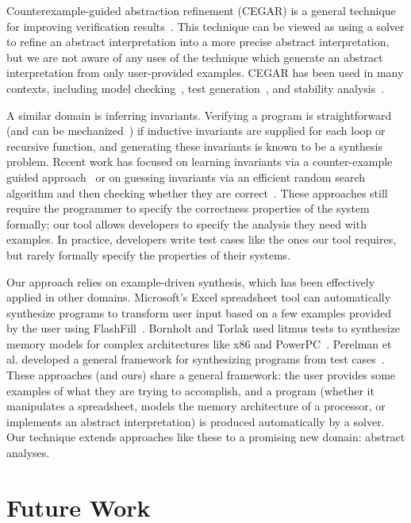 \documentclass[10pt,conference]{IEEEtran}
\begin{document}
Counterexample-guided abstraction refinement (CEGAR) is a general technique
for improving verification results~\cite{cegar}. This technique can be
viewed as using a solver to refine an abstract interpretation into a
more precise abstract interpretation, but we are not aware of any
uses of the technique which generate an abstract interpretation from
only user-provided examples. CEGAR has been used in many contexts,
including model checking~\cite{clarke2003counterexample},
test generation~\cite{beyer2004},
and stability analysis~\cite{prabhakar2016counterexample}.

A similar domain is inferring invariants. Verifying a program is straightforward
(and can be mechanized~\cite{hoare69}) if inductive invariants are supplied for
each loop or recursive function, and generating these invariants is
known to be a synthesis problem. Recent work has focused on learning
invariants via a counter-example guided approach~\cite{garg2014ice} or
on guessing invariants via an efficient random search algorithm and then
checking whether they are correct~\cite{sharma2016invariant}.
These approaches still require the programmer to specify the correctness
properties of the system formally; our tool allows developers to specify
the analysis they need with examples. In practice, developers write
test cases like the ones our tool requires, but rarely formally specify
the properties of their systems.

Our approach relies on example-driven synthesis, which has been effectively
applied in other domains. Microsoft's Excel spreadsheet tool can automatically
synthesize programs to transform user input based on a few examples
provided by the user using FlashFill~\cite{flashfill}. Bornholt and
Torlak used litmus tests to synthesize memory models for complex architectures
like x86 and PowerPC~\cite{bornholt17}. Perelman et al. developed a general
framework for synthesizing programs from test cases~\cite{perelman2014test}.
These approaches (and ours) share a general framework: the user provides
some examples of what they are trying to accomplish, and a program
(whether it manipulates a spreadsheet, models the memory architecture of
a processor, or implements an abstract interpretation) is produced
automatically by a solver. Our technique extends approaches like these
to a promising new domain: abstract analyses.

\section{Future Work}
\label{sec-fw}
\end{document}
